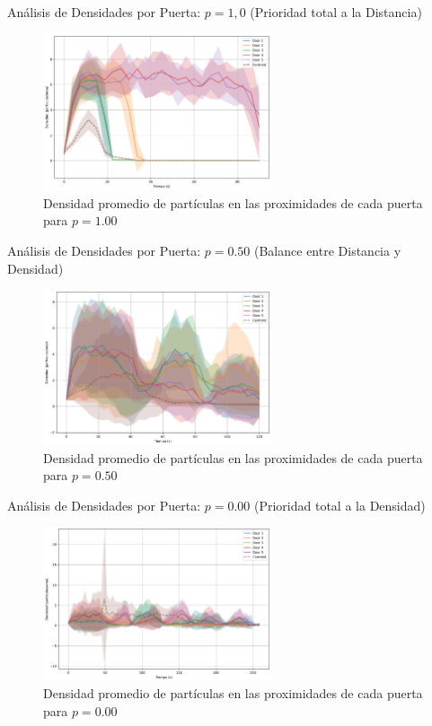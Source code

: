 \documentclass[aspectratio=169]{beamer}
\begin{document}
\begin{frame}{Análisis de Densidades por Puerta: $p = 1,0$ (Prioridad total a la Distancia)}
    \begin{figure}[H]
        \centering
        \includegraphics[width=0.6\textwidth]{img/circular_density_t_20_&_p_1.00.png}
        \caption{Densidad promedio de partículas en las proximidades de cada puerta para $p=1.00$}
        \label{fig:densidad_p100}
    \end{figure}
\end{frame}
\begin{frame}{Análisis de Densidades por Puerta: $p = 0.50$ (Balance entre Distancia y Densidad)}
    \begin{figure}[H]
        \centering
        \includegraphics[width=0.6\textwidth]{img/circular_density_t_20_&_p_0.50.png}
        \caption{Densidad promedio de partículas en las proximidades de cada puerta para $p=0.50$}
        \label{fig:densidad_p050}
    \end{figure}
\end{frame}
\begin{frame}{Análisis de Densidades por Puerta: $p = 0.00$ (Prioridad total a la Densidad)}
    \begin{figure}[H]
        \centering
        \includegraphics[width=0.6\textwidth]{img/circular_density_t_20_&_p_0.00.png}
        \caption{Densidad promedio de partículas en las proximidades de cada puerta para $p=0.00$}
        \label{fig:densidad_p000}
    \end{figure}
\end{frame}
\end{document}
